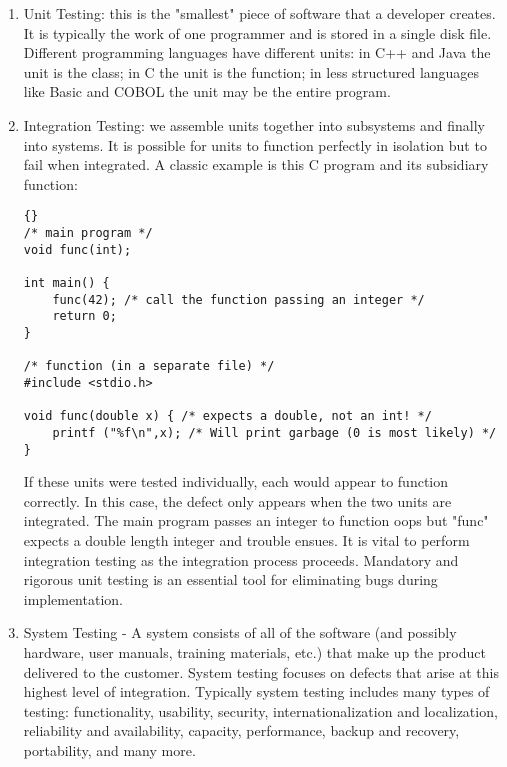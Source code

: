 \documentclass{report}
\begin{document}
\begin{enumerate}
\item Unit Testing: this is the "smallest" piece of software that a developer creates. It is typically the work of one programmer and is stored in a single disk file. Different programming languages have different units: in C++ and Java the unit is the class; in C the unit is the function; in less structured languages like Basic and COBOL the unit may be the entire program.

\item Integration Testing: we assemble units together into subsystems and finally into systems. It is possible for units to function perfectly in isolation but to fail when integrated. A classic example is this C program and its subsidiary function:
\begin{lstlisting}{}
/* main program */
void func(int);

int main() {
    func(42); /* call the function passing an integer */
    return 0;
}

/* function (in a separate file) */
#include <stdio.h>

void func(double x) { /* expects a double, not an int! */
    printf ("%f\n",x); /* Will print garbage (0 is most likely) */
}
\end{lstlisting}
If these units were tested individually, each would appear to function correctly. In this case, the defect only appears when the two units are integrated. The main program passes an integer to function oops but "func" expects a double length integer and trouble ensues. It is vital to perform integration testing as the integration process proceeds.
Mandatory and rigorous unit testing is an essential tool for eliminating bugs during implementation.

\item System Testing - A system consists of all of the software (and possibly hardware, user manuals, training materials, etc.) that make up the product delivered to the customer. System testing focuses on defects that arise at this highest level of integration. Typically system testing includes many types of testing: functionality, usability, security, internationalization and localization, reliability and availability, capacity, performance, backup and recovery, portability, and many more.


\end{enumerate}
\end{document}
